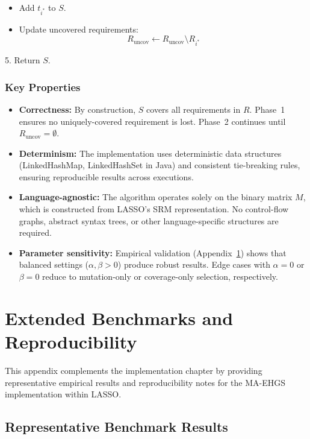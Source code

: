 \begin{appendices}
\begin{framed}
\begin{itemize}
  \item Add $t_{i^*}$ to $S$.
  
  \item Update uncovered requirements:
  \[
    R_{\text{uncov}} \leftarrow R_{\text{uncov}} \setminus R_{i^*}
  \]
\end{itemize}

5. Return $S$.
\end{framed}

\subsubsection*{Key Properties}

\begin{itemize}
  \item \textbf{Correctness:} By construction, $S$ covers all requirements in $R$. Phase~1 ensures no uniquely-covered requirement is lost. Phase~2 continues until $R_{\text{uncov}} = \emptyset$.
  
  \item \textbf{Determinism:} The implementation uses deterministic data structures (LinkedHashMap, LinkedHashSet in Java) and consistent tie-breaking rules, ensuring reproducible results across executions.
  
  \item \textbf{Language-agnostic:} The algorithm operates solely on the binary matrix $M$, which is constructed from LASSO's SRM representation. No control-flow graphs, abstract syntax trees, or other language-specific structures are required.
  
  \item \textbf{Parameter sensitivity:} Empirical validation (Appendix~\ref{app:benchmarks}) shows that balanced settings ($\alpha, \beta > 0$) produce robust results. Edge cases with $\alpha = 0$ or $\beta = 0$ reduce to mutation-only or coverage-only selection, respectively.
\end{itemize}


\section{Extended Benchmarks and Reproducibility}
\label{app:benchmarks}

This appendix complements the implementation chapter by providing representative empirical results and reproducibility notes for the MA-EHGS implementation within LASSO.

\subsection*{Representative Benchmark Results}


\end{appendices}
